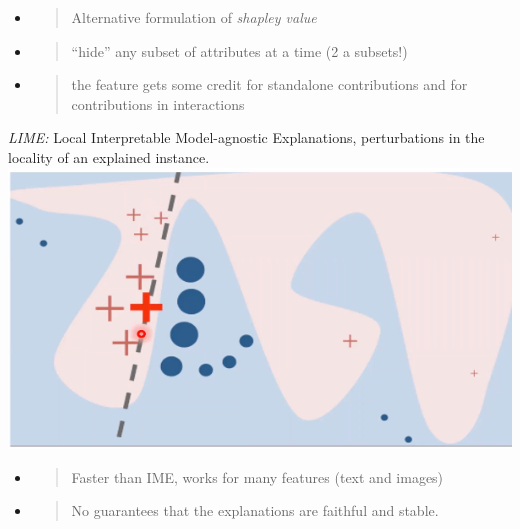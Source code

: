 \begin{itemize}
\item
  \begin{quote}
  Alternative formulation of \emph{shapley value}
  \end{quote}
\end{itemize}

\begin{itemize}
\item
  \begin{quote}
  ``hide'' any subset of attributes at a time (2 a subsets!)
  \end{quote}
\end{itemize}

\begin{itemize}
\item
  \begin{quote}
  the feature gets some credit for standalone contributions and for
  contributions in interactions
  \end{quote}
\end{itemize}

\textit{LIME:} Local Interpretable Model-agnostic Explanations,
perturbations in the locality of an explained
instance.
\includegraphics[width=\columnwidth]{media/image25.png}

\begin{itemize}
\item
  \begin{quote}
  Faster than IME, works for many features (text and images)
  \end{quote}
\end{itemize}

\begin{itemize}
\item
  \begin{quote}
  No guarantees that the explanations are faithful and stable.
  \end{quote}
\end{itemize}

